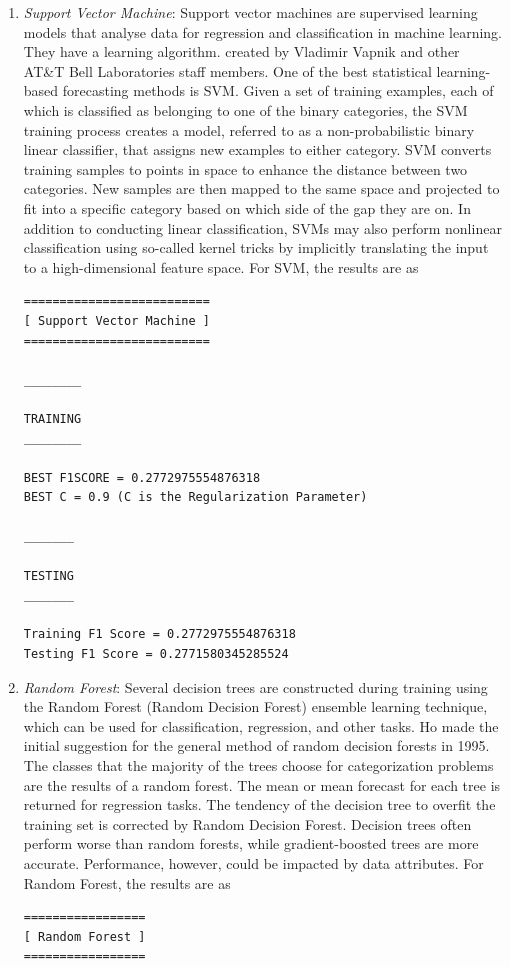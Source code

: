 \documentclass[runningheads]{llncs}
\begin{document}
\begin{enumerate}
\item \textit{Support Vector Machine}: Support vector machines are supervised learning models that analyse data for regression and classification in machine learning. They have a learning algorithm. created by Vladimir Vapnik and other AT\&T Bell Laboratories staff members. One of the best statistical learning-based forecasting methods is SVM. Given a set of training examples, each of which is classified as belonging to one of the binary categories, the SVM training process creates a model, referred to as a non-probabilistic binary linear classifier, that assigns new examples to either category. SVM converts training samples to points in space to enhance the distance between two categories. New samples are then mapped to the same space and projected to fit into a specific category based on which side of the gap they are on. In addition to conducting linear classification, SVMs may also perform nonlinear classification using so-called kernel tricks by implicitly translating the input to a high-dimensional feature space. For SVM, the results are as
\begin{verbatim}
==========================
[ Support Vector Machine ]
==========================

________

TRAINING
________

BEST F1SCORE = 0.2772975554876318
BEST C = 0.9 (C is the Regularization Parameter)

_______

TESTING
_______

Training F1 Score = 0.2772975554876318
Testing F1 Score = 0.2771580345285524

\end{verbatim}
\item \textit{Random Forest}: Several decision trees are constructed during training using the Random Forest (Random Decision Forest) ensemble learning technique, which can be used for classification, regression, and other tasks. Ho made the initial suggestion for the general method of random decision forests in 1995. The classes that the majority of the trees choose for categorization problems are the results of a random forest. The mean or mean forecast for each tree is returned for regression tasks. The tendency of the decision tree to overfit the training set is corrected by Random Decision Forest. Decision trees often perform worse than random forests, while gradient-boosted trees are more accurate. Performance, however, could be impacted by data attributes. For Random Forest, the results are as
\begin{verbatim}
=================
[ Random Forest ]
=================


\end{verbatim}
\end{enumerate}
\end{document}
